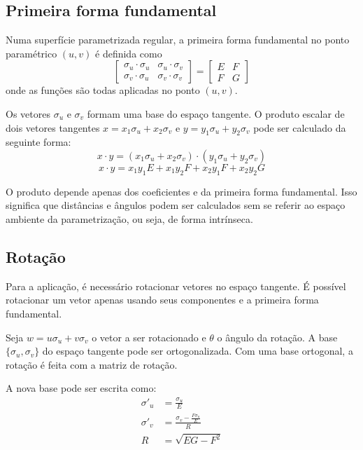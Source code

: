 \subsection{Primeira forma fundamental}
Numa superfície parametrizada regular,
a primeira forma fundamental no ponto paramétrico $(u,v)$ é definida como
\[
    \left[
        \begin{array}{cc}
            \sigma_u \cdot \sigma_u & \sigma_u \cdot \sigma_v \\
            \sigma_v \cdot \sigma_u & \sigma_v \cdot \sigma_v
        \end{array}
    \right]
    = 
    \left[
        \begin{array}{cc}
            E & F \\
            F & G
        \end{array}
    \right]
\]
onde as funções são todas aplicadas no ponto $(u,v)$.

Os vetores $\sigma_u$ e $\sigma_v$ formam uma base do espaço tangente.
O produto escalar de dois vetores tangentes 
$x = x_1 \sigma_u + x_2 \sigma_v$ e $y = y_1 \sigma_u + y_2 \sigma_v$ pode ser calculado da seguinte forma:
\[x\cdot y = (x_1 \sigma_u + x_2 \sigma_v) \cdot (y_1 \sigma_u + y_2 \sigma_v)\]
\[x\cdot y = x_1 y_1 E + x_1 y_2 F + x_2 y_1 F + x_2 y_2 G\]

O produto depende apenas dos coeficientes e da primeira forma fundamental.
Isso significa que distâncias e ângulos podem ser calculados
sem se referir ao espaço ambiente da parametrização, ou seja, de forma intrínseca.

\subsection{Rotação}
Para a aplicação, é necessário rotacionar vetores no espaço tangente.
É possível rotacionar um vetor apenas usando seus componentes e
a primeira forma fundamental.

Seja $w = u\sigma_u+v\sigma_v$ o vetor a ser rotacionado e $\theta$ o ângulo da rotação.
A base $\{\sigma_u, \sigma_v\}$ do espaço tangente pode ser ortogonalizada.
Com uma base ortogonal, a rotação é feita com a matriz de rotação.

A nova base pode ser escrita como:
\begin{align*}
    \sigma'_u &= \frac{\sigma_u}{E}\\
    \sigma'_v &= \frac{\sigma_v-\frac{F\sigma_u}{E}}{R}\\
    R &= \sqrt{EG-F^2}
\end{align*}

